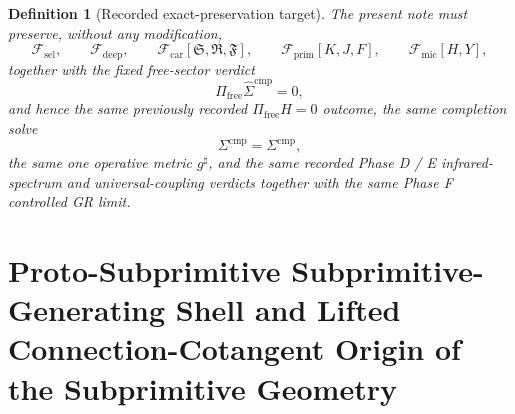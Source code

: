 \documentclass[11pt]{article}
\newcommand{\CompletedMetric}{g^{\sharp}}
\newcommand{\CompShift}{\Sigma^{\mathrm{cmp}}}
\newcommand{\CompLift}{\widehat\Sigma^{\mathrm{cmp}}}
\newcommand{\FreeProj}{\Pi_{\mathrm{free}}}
\newcommand{\GaugeAux}{Y}
\newcommand{\MicFunctional}{\mathscr F_{\mathrm{mic}}}
\newcommand{\PrimFunctional}{\mathscr F_{\mathrm{prim}}}
\newcommand{\CarrierFunctional}{\mathscr F_{\mathrm{car}}}
\newcommand{\DeepFunctional}{\mathscr F_{\mathrm{deep}}}
\newcommand{\StemFunctional}{\mathscr F_{\mathrm{sel}}}
\newcommand{\PrimStrain}{K}
\newcommand{\PrimNeutral}{J}
\newcommand{\PrimFree}{F}
\newcommand{\CarrierSeed}{\mathfrak S}
\newcommand{\RelabelSeed}{\mathfrak R}
\newcommand{\FreeSeed}{\mathfrak F}
\newtheorem{definition}{Definition}
\begin{document}
\begin{definition}[Recorded exact-preservation target]
\label{def:recorded_target}
The present note must preserve, without any modification,
\begin{equation}
\StemFunctional,
\qquad
\DeepFunctional,
\qquad
\CarrierFunctional[\CarrierSeed,\RelabelSeed,\FreeSeed],
\qquad
\PrimFunctional[\PrimStrain,\PrimNeutral,\PrimFree],
\qquad
\MicFunctional[H,\GaugeAux],
\label{eq:target_functionals}
\end{equation}
together with the fixed free-sector verdict
\begin{equation}
\FreeProj\CompLift=0,
\label{eq:target_free}
\end{equation}
and hence the same previously recorded \(\Pi_{\mathrm{free}}H=0\) outcome, the same completion solve
\begin{equation}
\CompShift=\Sigma^{\mathrm{cmp}},
\label{eq:target_sigma}
\end{equation}
the same one operative metric \(\CompletedMetric\), and the same recorded Phase D / E infrared-spectrum and universal-coupling verdicts together with the same Phase F controlled GR limit.
\end{definition}

\section{Proto-Subprimitive Subprimitive-Generating Shell and Lifted Connection-Cotangent Origin of the Subprimitive Geometry}
\end{document}
